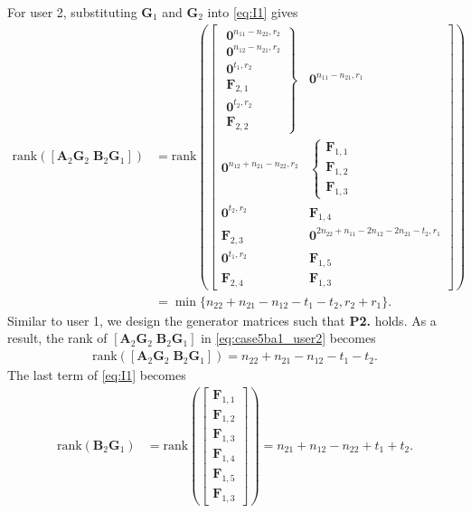 \documentclass[12pt, draftclsnofoot, onecolumn]{IEEEtran}
\theoremstyle{definition}
\begin{document}
For user 2, substituting $\boldsymbol{G}_1$ and $\boldsymbol{G}_2$ into \eqref{eq:I1} gives
\begin{align}\label{eq:case5ba1_user2}
\text{rank}([\boldsymbol{A}_2\boldsymbol{G}_2 \; \boldsymbol{B}_2\boldsymbol{G}_1]) &=
\text{rank}\left(\begin{bmatrix}
\left. {\begin{array}{*{20}{c}}
\boldsymbol{0}^{n_{11}-n_{22},r_2} \\
\boldsymbol{0}^{n_{12}-n_{21},r_2}\\
\boldsymbol{0}^{t_1,r_2}\\
\boldsymbol{F}_{2,1} \\
\boldsymbol{0}^{t_2,r_2}\\
\boldsymbol{F}_{2,2}
\end{array}} \right\} & \boldsymbol{0}^{n_{11}-n_{21},r_1} \\
\boldsymbol{0}^{n_{12}+n_{21}-n_{22},r_2}& \left\{ {\begin{array}{*{20}{c}}
\boldsymbol{F}_{1,1}\\
\boldsymbol{F}_{1,2}\\
\boldsymbol{F}_{1,3}
\end{array}} \right.\\
\boldsymbol{0}^{t_2,r_2} &\boldsymbol{F}_{1,4}\\
\boldsymbol{F}_{2,3} &\boldsymbol{0}^{2n_{22}+n_{11}-2n_{12}-2n_{21}-t_2 ,r_1}\\
\boldsymbol{0}^{t_1,r_2} &\boldsymbol{F}_{1,5}\\
\boldsymbol{F}_{2,4} &\boldsymbol{F}_{1,3}
\end{bmatrix}
\right)\nonumber \\
&= \min\{n_{22}+n_{21}-n_{12}-t_1-t_2,r_2+r_1\}.
\end{align}
Similar to user 1, we design the generator matrices such that {\bf P2.} holds. %
As a result, the rank of $[\boldsymbol{A}_2\boldsymbol{G}_2 \; \boldsymbol{B}_2\boldsymbol{G}_1]$ in \eqref{eq:case5ba1_user2} becomes
\begin{align}
\text{rank}([\boldsymbol{A}_2\boldsymbol{G}_2 \; \boldsymbol{B}_2\boldsymbol{G}_1])= n_{22}+n_{21}-n_{12}-t_1-t_2.
\end{align}
The last term of \eqref{eq:I1} becomes
\begin{align}
\text{rank}(\boldsymbol{B}_2\boldsymbol{G}_1) &= \text{rank}\left(\begin{bmatrix}
\boldsymbol{F}_{1,1} \\
\boldsymbol{F}_{1,2} \\
\boldsymbol{F}_{1,3} \\
\boldsymbol{F}_{1,4} \\
\boldsymbol{F}_{1,5} \\
\boldsymbol{F}_{1,3}
\end{bmatrix}
\right)=  n_{21}+n_{12}-n_{22}+t_1+t_2. \label{eq:case5ba1_user2a}
\end{align}
\end{document}

